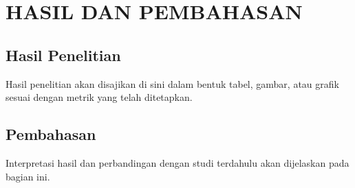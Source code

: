 \chapter{HASIL DAN PEMBAHASAN}

\section{Hasil Penelitian}
Hasil penelitian akan disajikan di sini dalam bentuk tabel, gambar, atau grafik sesuai dengan metrik yang telah ditetapkan.

\section{Pembahasan}
Interpretasi hasil dan perbandingan dengan studi terdahulu akan dijelaskan pada bagian ini.
